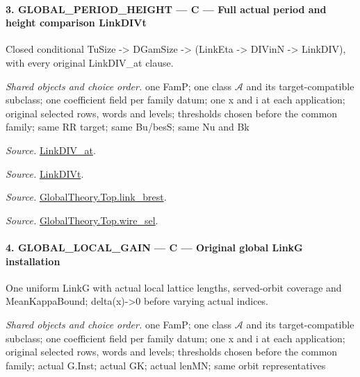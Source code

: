 \paragraph{3. GLOBAL\_\allowbreak PERIOD\_\allowbreak HEIGHT — C — Full actual period and height comparison LinkDIVt}

Closed conditional TuSize -> DGamSize -> (LinkEta -> DIVinN -> LinkDIV), with every original LinkDIV\_\allowbreak at clause.

\emph{Shared objects and choice order.} one FamP; one class $\mathcal A$ and its target-compatible subclass; one coefficient field per family datum; one x and i at each application; original selected rows, words and levels; thresholds chosen before the common family; same RR target; same Bu/besS; same Nu and Bk

\emph{Source.} \href{https://github.com/CocoSgt/riemann-hypothesis-lean/blob/7cbf7a0c32fca1badf05931879a37c3f8a2b03b4/src/Formalism/SharpRestriction/GlobalTheoremInputs.lean#L77-L90}{LinkDIV\_\allowbreak at}.

\emph{Source.} \href{https://github.com/CocoSgt/riemann-hypothesis-lean/blob/7cbf7a0c32fca1badf05931879a37c3f8a2b03b4/src/Formalism/SharpRestriction/GlobalTheoremInputs.lean#L94-L96}{LinkDIVt}.

\emph{Source.} \href{https://github.com/CocoSgt/riemann-hypothesis-lean/blob/7cbf7a0c32fca1badf05931879a37c3f8a2b03b4/src/Development/AbelianVarietyTheory/Proofs/GlobalInterpolation/LinkBrest.lean#L7-L25}{GlobalTheory.Top.link\_\allowbreak brest}.

\emph{Source.} \href{https://github.com/CocoSgt/riemann-hypothesis-lean/blob/7cbf7a0c32fca1badf05931879a37c3f8a2b03b4/src/Development/AbelianVarietyTheory/Proofs/GlobalInterpolation/WireSel.lean#L11-L41}{GlobalTheory.Top.wire\_\allowbreak sel}.



\paragraph{4. GLOBAL\_\allowbreak LOCAL\_\allowbreak GAIN — C — Original global LinkG installation}

One uniform LinkG with actual local lattice lengths, served-orbit coverage and MeanKappaBound; delta(x)->0 before varying actual indices.

\emph{Shared objects and choice order.} one FamP; one class $\mathcal A$ and its target-compatible subclass; one coefficient field per family datum; one x and i at each application; original selected rows, words and levels; thresholds chosen before the common family; actual G.Inst; actual GK; actual lenMN; same orbit representatives

